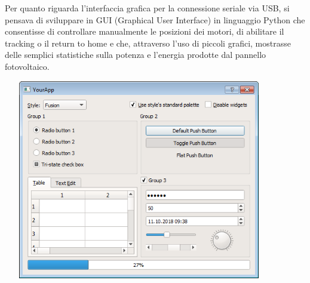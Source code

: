 \noindent Per quanto riguarda l'interfaccia grafica per la connessione seriale via
USB, si pensava di sviluppare in GUI (Graphical User Interface) in
linguaggio Python che consentisse di controllare manualmente le
posizioni dei motori, di abilitare il tracking o il return to home e
che, attraverso l'uso di piccoli grafici, mostrasse delle semplici
statistiche sulla potenza e l'energia prodotte dal pannello
fotovoltaico.

\begin{center}
\includegraphics[width=4.68229in,height=3.4426in]{figures/image47.png}
\captionsetup{type=figure}
\end{center}

